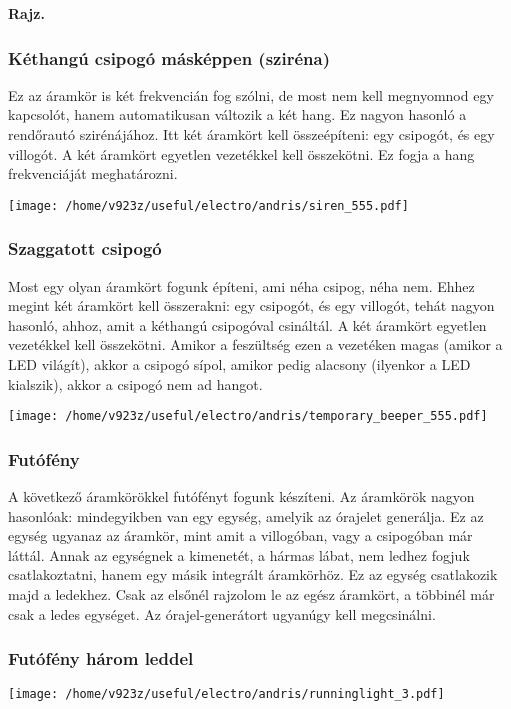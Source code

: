 \documentclass[16pt]{scrreprt}
\begin{document}
\textbf{Rajz.}

\subsubsection{Kéthangú csipogó másképpen (sziréna)}

Ez az áramkör is két frekvencián fog szólni, de most nem kell megnyomnod egy kapcsolót, hanem automatikusan változik a két hang. Ez nagyon hasonló a rendőrautó szirénájához. Itt két áramkört kell összeépíteni: egy csipogót, és egy villogót. A két áramkört egyetlen vezetékkel kell összekötni. Ez fogja a hang frekvenciáját meghatározni. 

\texttt{[image: /home/v923z/useful/electro/andris/siren\_555.pdf]}


\subsubsection{Szaggatott csipogó}

Most egy olyan áramkört fogunk építeni, ami néha csipog, néha nem. Ehhez megint két áramkört kell összerakni: egy csipogót, és egy villogót, tehát nagyon hasonló, ahhoz, amit a kéthangú csipogóval csináltál. A két áramkört egyetlen vezetékkel kell összekötni. Amikor a feszültség ezen a vezetéken magas (amikor a LED világít), akkor a csipogó sípol, amikor pedig alacsony (ilyenkor a LED kialszik), akkor a csipogó nem ad hangot.  

\texttt{[image: /home/v923z/useful/electro/andris/temporary\_beeper\_555.pdf]}

\subsubsection{Futófény}

A következő áramkörökkel futófényt fogunk készíteni. Az áramkörök nagyon hasonlóak: mindegyikben van egy egység,
amelyik az órajelet generálja. Ez az egység ugyanaz az áramkör, mint amit a villogóban, vagy a csipogóban már láttál.
Annak az egységnek a kimenetét, a hármas lábat, nem ledhez fogjuk csatlakoztatni, hanem egy másik integrált áramkörhöz.
Ez az egység csatlakozik majd a ledekhez. Csak az elsőnél rajzolom le az egész áramkört, a többinél már csak a ledes
egységet. Az órajel-generátort ugyanúgy kell megcsinálni.

\subsubsection{Futófény három leddel}
\texttt{[image: /home/v923z/useful/electro/andris/runninglight\_3.pdf]}
\end{document}
